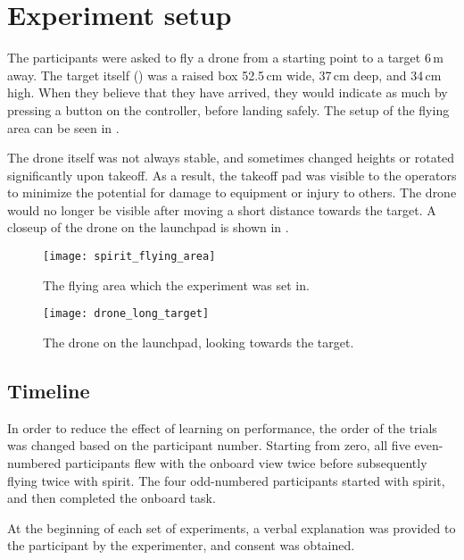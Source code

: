 \section{Experiment setup}
The participants were asked to fly a drone from a starting point to a target 6\,m away.
The target itself () was a raised box 52.5\,cm wide, 37\,cm deep, and 34\,cm high.
When they believe that they have arrived, they would indicate as much by pressing a button on the controller, before landing safely.
The setup of the flying area can be seen in .

The drone itself was not always stable, and sometimes changed heights or rotated significantly upon takeoff.
As a result, the takeoff pad was visible to the operators to minimize the potential for damage to equipment or injury to others.
The drone would no longer be visible after moving a short distance towards the target.
A closeup of the drone on the launchpad is shown in .

\begin{figure}
\centering
\hfill
\begin{minipage}{0.45\textwidth}
  \centering
  \texttt{[image: spirit\_flying\_area]}
  \caption[Flying area]{The flying area which the experiment was set in.}
  \label{fig:flying_area}
\end{minipage}%
\hfill
\begin{minipage}{.45\textwidth}
  \centering
  \texttt{[image: drone\_long\_target]}
  \caption[Drone on pad]{The drone on the launchpad, looking towards the target.}
  \label{fig:drone_long_target}
\end{minipage}
\hfill
\end{figure}

\subsection{Timeline}
In order to reduce the effect of learning on performance, the order of the trials was changed based on the participant number.
Starting from zero, all five even-numbered participants flew with the onboard view twice before subsequently flying twice with \gls{spirit}.
The four odd-numbered participants started with \gls{spirit}, and then completed the onboard task.

At the beginning of each set of experiments, a verbal explanation was provided to the participant by the experimenter, and consent was obtained.

